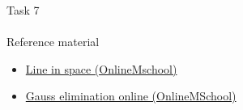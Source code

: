 \documentclass[aspectratio=169]{beamer}
\newcommand{\fbckg}[1]{\usebackgroundtemplate{\texttt{[image: \#1]}}}%
\begin{document}
\begin{frame}[t]{Task 7}
    \framesubtitle{}
\end{frame}

\begin{frame}[t]{Reference material}
    \Large
    \begin{itemize}
        \item \href{https://onlinemschool.com/math/library/analytic_geometry/line/}{Line in space (OnlineMschool)}
        \item \href{https://onlinemschool.com/math/assistance/equation/gaus/}{Gauss elimination online (OnlineMSchool)}
    \end{itemize}
\end{frame}

\fbckg{fibeamer/figs/last_page.png}
\frame[plain]{}
\end{document}
